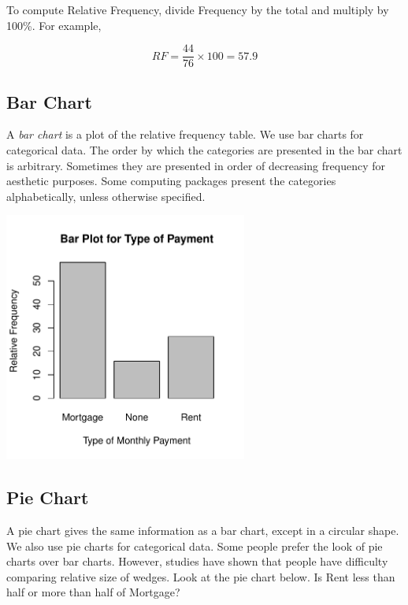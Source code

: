\documentclass[11pt, chapterprefix=true]{scrbook}\usepackage[]{graphicx}\usepackage[]{color}
\begin{document}
To compute Relative Frequency, divide Frequency by the total and multiply by 100\%.  For example,

\begin{equation}
RF = \frac{44}{76} \times 100 = 57.9 \nonumber
\end{equation}

\subsection{Bar Chart}

A \textit{bar chart} is a plot of the relative frequency table.  We use bar charts for categorical data.  The order by which the categories are presented in the bar chart is arbitrary.  Sometimes they are presented in order of decreasing frequency for aesthetic purposes.  Some computing packages present the categories alphabetically, unless otherwise specified.



{\centering \includegraphics[width=8cm]{figure/LBL2b-1} 

}




\subsection{Pie Chart}

A pie chart gives the same information as a bar chart, except in a circular shape.  We also use pie charts for categorical data.   Some people prefer the look of pie charts over bar charts.  However, studies have shown that people have difficulty comparing relative size of wedges.  Look at the pie chart below.  Is Rent less than half or more than half of Mortgage?
\end{document}
